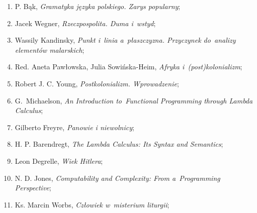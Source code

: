 \documentclass[a4paper,11pt]{article}
\begin{document}
\begin{enumerate}
\item P. Bąk, \emph{Gramatyka języka polskiego. Zarys popularny};

\item Jacek Wegner, \emph{Rzeczpospolita. Duma i~wstyd};

\item Wassily Kandinsky, \emph{Punkt i~linia a~płaszczyzna. Przyczynek
    do~analizy elementów malarskich};

\item Red. Aneta Pawłowska, Julia Sowińska-Heim, \emph{Afryka
    i~(post)kolonializm};

\item Robert J. C. Young, \emph{Postkolonializm. Wprowadzenie};

\item G.~Michaelson, \emph{An Introduction to~Functional Programming
    through Lambda Calculus};

\item Gilberto Freyre, \emph{Panowie i niewolnicy};

\item H. P. Barendregt, \emph{The Lambda Calculus: Its Syntax and
    Semantics};

\item Leon Degrelle, \emph{Wiek Hitlera};

\item N. D. Jones, \emph{Computability and Complexity: From
    a~Programming Perspective};

\item Ks. Marcin Worbs, \emph{Człowiek w~misterium liturgii};


\end{enumerate}
\end{document}
